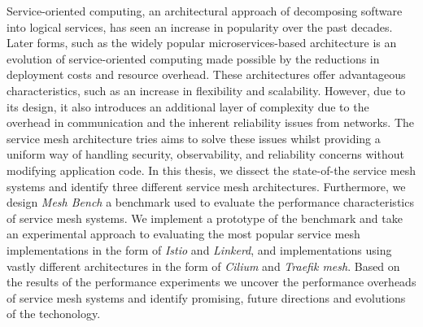 


\begin{abstracts}        %
Service-oriented computing, an architectural approach of decomposing software into logical services, has seen an increase in popularity over the past decades. Later forms, such as the widely popular microservices-based architecture is an evolution of service-oriented computing made possible by the reductions in deployment costs and resource overhead. These architectures offer advantageous characteristics, such as an increase in flexibility and scalability. However, due to its design, it also introduces an additional layer of complexity due to the overhead in communication and the inherent reliability issues from networks. The service mesh architecture tries aims to solve these issues whilst providing a uniform way of handling security, observability, and reliability concerns without modifying application code. In this thesis, we dissect the state-of-the service mesh systems and identify three different service mesh architectures. Furthermore, we design \textit{Mesh Bench} a benchmark used to evaluate the performance characteristics of service mesh systems. We implement a prototype of the benchmark and take an experimental approach to evaluating the most popular service mesh implementations in the form of \textit{Istio} and \textit{Linkerd}, and implementations using vastly different architectures in the form of \textit{Cilium} and \textit{Traefik mesh}. Based on the results of the performance experiments we uncover the performance overheads of service mesh systems and identify promising, future directions and evolutions of the techonology.

\end{abstracts}


